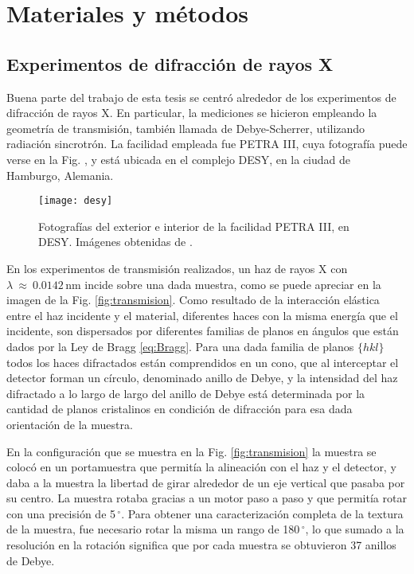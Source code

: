 \chapter{Materiales y métodos}\label{C:Materiales}
\graphicspath{{./figs/02_Mat/}}
\section{Experimentos de difracción de rayos X}\label{S:MatXRD}
Buena parte del trabajo de esta tesis se centró alrededor de los experimentos de difracción de rayos X.
En particular, la mediciones se hicieron empleando la geometría de transmisión, también llamada de Debye-Scherrer, utilizando radiación sincrotrón.
La facilidad empleada fue PETRA III, cuya fotografía puede verse en la Fig. \label{fig:desy}, y está ubicada en el complejo DESY, en la ciudad de Hamburgo, Alemania\cite{desy}.

\begin{figure}[!htb]
  \centering
  \texttt{[image: desy]}
  \caption{Fotografías del exterior e interior de la facilidad PETRA III, en DESY. Imágenes obtenidas de \cite{desy}.}
  \label{fig:desy}
\end{figure}

En los experimentos de transmisión realizados, un haz de rayos X con $\lambda \ \approx \ 0.0142$\,nm incide sobre una dada muestra, como se puede apreciar en la imagen de la Fig. \ref{fig:transmision}. 
Como resultado de la interacción elástica entre el haz incidente y el material, diferentes haces con la misma energía que el incidente, son dispersados por diferentes familias de planos en ángulos que están dados por la Ley de Bragg \ref{eq:Bragg}.
Para una dada familia de planos $\{hkl\}$ todos los haces difractados están comprendidos en un cono, que al interceptar el detector forman un círculo, denominado anillo de Debye, y la intensidad del haz difractado a lo largo de largo del anillo de Debye está determinada por la cantidad de planos cristalinos en condición de difracción para esa dada orientación de la muestra.

En la configuración que se muestra en la Fig. \ref{fig:transmision} la muestra se colocó en un portamuestra que permitía la alineación con el haz y el detector, y daba a la muestra la libertad de girar alrededor de un eje vertical que pasaba por su centro.
La muestra rotaba gracias a un motor paso a paso y que permitía rotar con una precisión de 5\,$^{\circ}$.
Para obtener una caracterización completa de la textura de la muestra, fue necesario rotar la misma un rango de 180\,$^{\circ}$, lo que sumado a la resolución en la rotación significa que por cada muestra se obtuvieron 37 anillos de Debye.


